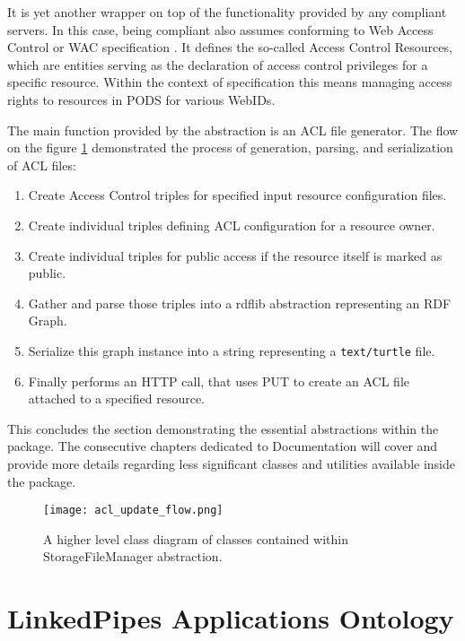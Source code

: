 It is yet another wrapper on top of the functionality provided by any \solid{} compliant servers. In this case, being \solid{} compliant also assumes conforming to Web Access Control or WAC specification \cite{Solid:WAC}. It defines the so-called Access Control Resources, which are entities serving as the declaration of access control privileges for a specific resource. Within the context of \solid{} specification this means managing access rights to resources in \solid{} PODS for various WebIDs.

The main function provided by the abstraction is an ACL file generator. The flow on the figure \ref{fig:lps_acl_update_flow} demonstrated the process of generation, parsing, and serialization of ACL files: 

\begin{enumerate}
    \item Create Access Control triples for specified input resource configuration files.
    \item Create individual triples defining ACL configuration for a resource owner.
    \item Create individual triples for public access if the resource itself is marked as public.
    \item Gather and parse those triples into a rdflib abstraction representing an RDF Graph.
    \item Serialize this graph instance into a string representing a \texttt{text/turtle} file.
    \item Finally performs an HTTP call, that uses PUT to create an ACL file attached to a specified resource.
\end{enumerate}

This concludes the section demonstrating the essential abstractions within the \lpas{} package. The consecutive chapters dedicated to Documentation will cover and provide more details regarding less significant classes and utilities available inside the package.

\begin{figure}[h]
\centering
\texttt{[image: acl\_update\_flow.png]}
\caption{A higher level class diagram of classes contained within StorageFileManager abstraction.}
\label{fig:lps_acl_update_flow}
\end{figure}


\section{LinkedPipes Applications Ontology}

